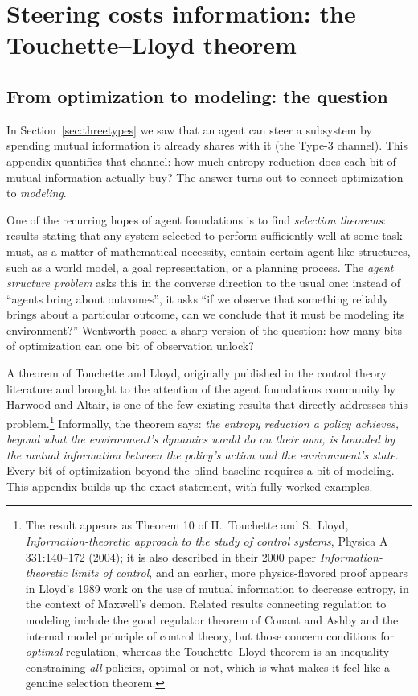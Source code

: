 \documentclass[10pt]{article}
\theoremstyle{definition}
\theoremstyle{remark}
\begin{document}
\section{Steering costs information: the Touchette--Lloyd theorem}
\label{sec:tl}

\subsection{From optimization to modeling: the question}
\label{sec:tlquestion}

In Section~\ref{sec:threetypes} we saw that an agent can steer a subsystem by spending mutual information it already shares with it (the Type-3 channel). This appendix quantifies that channel: how much entropy reduction does each bit of mutual information actually buy? The answer turns out to connect optimization to \emph{modeling}.

One of the recurring hopes of agent foundations is to find \emph{selection theorems}: results stating that any system selected to perform sufficiently well at some task must, as a matter of mathematical necessity, contain certain agent-like structures, such as a world model, a goal representation, or a planning process. The \emph{agent structure problem} asks this in the converse direction to the usual one: instead of ``agents bring about outcomes'', it asks ``if we observe that something reliably brings about a particular outcome, can we conclude that it must be modeling its environment?'' Wentworth posed a sharp version of the question: how many bits of optimization can one bit of observation unlock?

A theorem of Touchette and Lloyd, originally published in the control theory literature and brought to the attention of the agent foundations community by Harwood and Altair, is one of the few existing results that directly addresses this problem.\footnote{The result appears as Theorem 10 of H.~Touchette and S.~Lloyd, \emph{Information-theoretic approach to the study of control systems}, Physica A 331:140--172 (2004); it is also described in their 2000 paper \emph{Information-theoretic limits of control}, and an earlier, more physics-flavored proof appears in Lloyd's 1989 work on the use of mutual information to decrease entropy, in the context of Maxwell's demon. Related results connecting regulation to modeling include the good regulator theorem of Conant and Ashby and the internal model principle of control theory, but those concern conditions for \emph{optimal} regulation, whereas the Touchette--Lloyd theorem is an inequality constraining \emph{all} policies, optimal or not, which is what makes it feel like a genuine selection theorem.} Informally, the theorem says: \emph{the entropy reduction a policy achieves, beyond what the environment's dynamics would do on their own, is bounded by the mutual information between the policy's action and the environment's state}. Every bit of optimization beyond the blind baseline requires a bit of modeling. This appendix builds up the exact statement, with fully worked examples.
\end{document}

